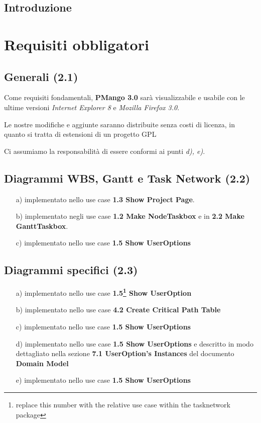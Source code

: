 \documentclass[a4paper, 12pt]{report}
\begin{document}
\tableofcontents

\newpage

\section*{Introduzione}

\chapter{Requisiti obbligatori}

\section{Generali (2.1)}
Come requisiti fondamentali, \textbf{PMango 3.0} sar\`a visualizzabile e
usabile con le ultime versioni \emph{Internet Explorer 8} e \emph{Mozilla
Firefox 3.0}.

Le nostre modifiche e aggiunte saranno distribuite senza costi di licenza, in
quanto si tratta di estensioni di un progetto GPL

Ci assumiamo la responsabilit\`a di essere conformi ai punti \emph{d), e)}.

\section{Diagrammi WBS, Gantt e Task Network (2.2)}
\begin{itemize}
  \item[a)] implementato nello use case \textbf{1.3 Show Project Page}.
  \item[b)] implementato negli use case \textbf{1.2 Make NodeTaskbox} e in
  \textbf{2.2 Make GanttTaskbox}.
  \item[c)] implementato nello use case \textbf{1.5 Show UserOptions}
\end{itemize}

\section{Diagrammi specifici (2.3)}
\begin{itemize}
  \item[a)] implementato nello use case \textbf{1.5\footnote{replace this
  number with the relative use case within the tasknetwork package} Show
  UserOption}
  \item[b)] implementato nello use case \textbf{4.2 Create Critical Path Table}
  \item[c)] implementato nello use case \textbf{1.5 Show UserOptions}
  \item[d)] implementato nello use case \textbf{1.5 Show UserOptions} e
  descritto in modo dettagliato nella sezione \textbf{7.1 UserOption’s
  Instances} del documento \textbf{Domain Model}
  \item[e)] implementato nello use case \textbf{1.5 Show UserOptions}
\end{itemize}
\end{document}
